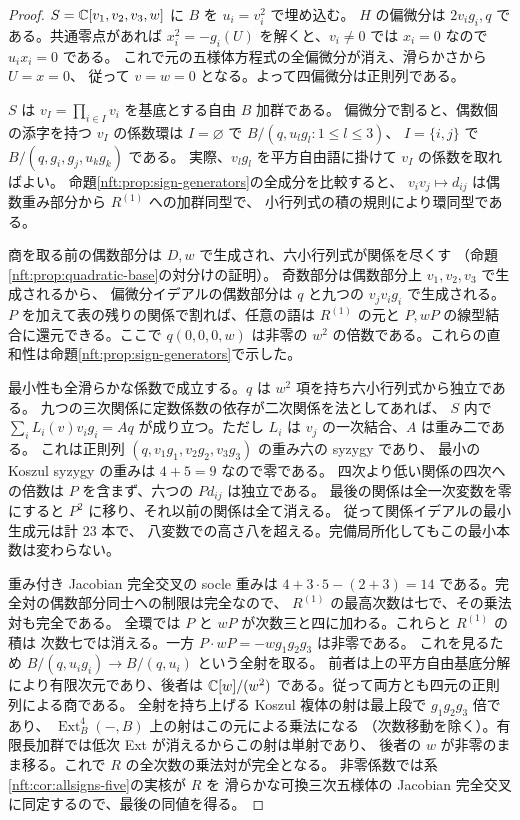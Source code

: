 \begin{proof}
$S=\mathbb C[v_1,v_2,v_3,w]$ に $B$ を $u_i=v_i^2$ で埋め込む。
$H$ の偏微分は $2v_i g_i,q$ である。共通零点があれば
$x_i^2=-g_i(U)$ を解くと、$v_i\ne0$ では $x_i=0$ なので $u_ix_i=0$ である。
これで元の五様体方程式の全偏微分が消え、滑らかさから $U=x=0$、
従って $v=w=0$ となる。よって四偏微分は正則列である。

$S$ は $v_I=\prod_{i\in I}v_i$ を基底とする自由 $B$ 加群である。
偏微分で割ると、偶数個の添字を持つ $v_I$ の係数環は
$I=\varnothing$ で $B/(q,u_lg_l:1\le l\le3)$、
$I=\{i,j\}$ で $B/(q,g_i,g_j,u_k g_k)$ である。
実際、$v_l g_l$ を平方自由語に掛けて $v_I$ の係数を取ればよい。
命題\ref{nft:prop:sign-generators}の全成分を比較すると、
$v_iv_j\mapsto d_{ij}$ は偶数重み部分から $R^{(1)}$ への加群同型で、
小行列式の積の規則により環同型である。

商を取る前の偶数部分は $D,w$ で生成され、六小行列式が関係を尽くす
（命題\ref{nft:prop:quadratic-base}の対分けの証明）。
奇数部分は偶数部分上 $v_1,v_2,v_3$ で生成されるから、
偏微分イデアルの偶数部分は $q$ と九つの $v_jv_i g_i$ で生成される。
$P$ を加えて表の残りの関係で割れば、任意の語は
$R^{(1)}$ の元と $P,wP$ の線型結合に還元できる。ここで
$q(0,0,0,w)$ は非零の $w^2$ の倍数である。これらの直和性は命題\ref{nft:prop:sign-generators}で示した。

最小性も全滑らかな係数で成立する。$q$ は $w^2$ 項を持ち六小行列式から独立である。
九つの三次関係に定数係数の依存が二次関係を法としてあれば、
$S$ 内で $\sum_i L_i(v)v_i g_i=Aq$ が成り立つ。ただし
$L_i$ は $v_j$ の一次結合、$A$ は重み二である。
これは正則列 $(q,v_1g_1,v_2g_2,v_3g_3)$ の重み六の syzygy であり、
最小の Koszul syzygy の重みは $4+5=9$ なので零である。
四次より低い関係の四次への倍数は $P$ を含まず、六つの $Pd_{ij}$ は独立である。
最後の関係は全一次変数を零にすると $P^2$ に移り、それ以前の関係は全て消える。
従って関係イデアルの最小生成元は計 $23$ 本で、
八変数での高さ八を超える。完備局所化してもこの最小本数は変わらない。

重み付き Jacobian 完全交叉の socle 重みは
$4+3\cdot5-(2+3)=14$ である。完全対の偶数部分同士への制限は完全なので、
$R^{(1)}$ の最高次数は七で、その乗法対も完全である。
全環では $P$ と $wP$ が次数三と四に加わる。これらと $R^{(1)}$ の積は
次数七では消える。一方 $P\cdot wP=-w g_1g_2g_3$ は非零である。
これを見るため $B/(q,u_i g_i)\to B/(q,u_i)$ という全射を取る。
前者は上の平方自由基底分解により有限次元であり、後者は
$\mathbb C[w]/(w^2)$ である。従って両方とも四元の正則列による商である。
全射を持ち上げる Koszul 複体の射は最上段で $g_1g_2g_3$ 倍であり、
$\operatorname{Ext}^4_B(-,B)$ 上の射はこの元による乗法になる
（次数移動を除く）。有限長加群では低次 Ext が消えるからこの射は単射であり、
後者の $w$ が非零のまま移る。これで $R$ の全次数の乗法対が完全となる。
非零係数では系\ref{nft:cor:allsigns-five}の実核が $R$ を
滑らかな可換三次五様体の Jacobian 完全交叉に同定するので、最後の同値を得る。
\end{proof}

